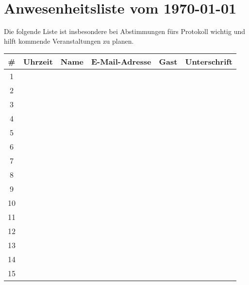 \documentclass[a4paper]{scrartcl}
\newcommand\datum{\today}  %
\begin{document}
\clearpage
\thispagestyle{empty}
\section*{Anwesenheitsliste vom \datum}

Die folgende Liste ist insbesondere bei Abstimmungen fürs Protokoll
wichtig und hilft kommende Veranstaltungen zu planen.

\begin{tabular}{c|p{2cm}|p{5cm}|p{5cm}|l|p{5cm}}
\toprule
\textbf{\#} & \textbf{Uhrzeit} & \textbf{Name} & \textbf{E-Mail-Adresse} & \textbf{Gast}  & \textbf{Unterschrift} \\\hline\hline
1  & ~       & ~    & ~       & ~                          & ~            \\[1.2cm]\hline
2  &~       & ~    & ~       & ~                           & ~            \\[1.2cm]\hline
3  &~       & ~    & ~       & ~                           & ~            \\[1.2cm]\hline
4  &~       & ~    & ~       & ~                           & ~            \\[1.2cm]\hline
5  &~       & ~    & ~       & ~                           & ~            \\[1.2cm]\hline
6  &~       & ~    & ~       & ~                           & ~            \\[1.2cm]\hline
7  &~       & ~    & ~       & ~                           & ~            \\[1.2cm]\hline
8  &~       & ~    & ~       & ~                           & ~            \\[1.2cm]\hline
9  &~       & ~    & ~       & ~                           & ~            \\[1.2cm]\hline
10 &~       & ~    & ~       & ~                           & ~            \\[1.2cm]\hline
11 &~       & ~    & ~       & ~                           & ~            \\[1.2cm]\hline
12 &~       & ~    & ~       & ~                           & ~            \\[1.2cm]\hline
13 &~       & ~    & ~       & ~                           & ~            \\[1.2cm]\hline
14 &~       & ~    & ~       & ~                           & ~            \\[1.2cm]\hline
15 &~       & ~    & ~       & ~                           & ~            \\[1.2cm]
\bottomrule
\end{tabular}
\clearpage
\end{document}
